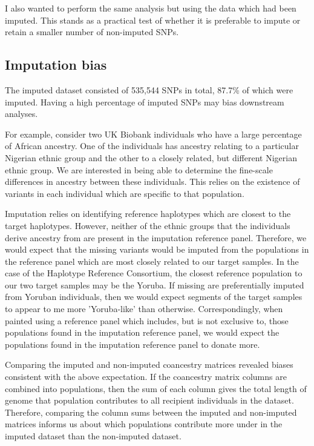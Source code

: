 I also wanted to perform the same analysis but using the data which had been imputed. This stands as a practical test of whether it is preferable to impute or retain a smaller number of non-imputed SNPs. 

\subsection{Imputation bias}

The imputed dataset consisted of 535,544 SNPs in total, 87.7\% of which were imputed. Having a high percentage of imputed SNPs may bias downstream analyses. 

For example, consider two UK Biobank individuals who have a large percentage of African ancestry. One of the individuals has ancestry relating to a particular Nigerian ethnic group and the other to a closely related, but different Nigerian ethnic group. We are interested in being able to determine the fine-scale differences in ancestry between these individuals. This relies on the existence of variants in each individual which are specific to that population.

Imputation relies on identifying reference haplotypes which are closest to the target haplotypes. However, neither of the ethnic groups that the individuals derive ancestry from are present in the imputation reference panel. Therefore, we would expect that the missing variants would be imputed from the populations in the reference panel which are most closely related to our target samples. In the case of the Haplotype Reference Consortium, the closest reference population to our two target samples may be the Yoruba. If missing are preferentially imputed from Yoruban individuals, then we would expect segments of the target samples to appear to me more 'Yoruba-like' than otherwise. Correspondingly, when painted using a reference panel which includes, but is not exclusive to, those populations found in the imputation reference panel, we would expect the populations found in the imputation reference panel to donate more.

Comparing the imputed and non-imputed coancestry matrices revealed biases consistent with the above expectation. If the coancestry matrix columns are combined into populations, then the sum of each column gives the total length of genome that population contributes to all recipient individuals in the dataset. Therefore, comparing the column sums between the imputed and non-imputed matrices informs us about which populations contribute more under in the imputed dataset than the non-imputed dataset. 

